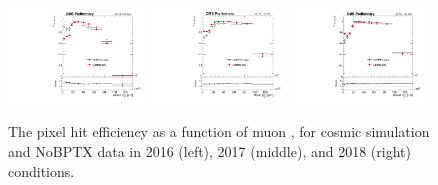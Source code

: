 \begin{figure}
\centering
\includegraphics[width=0.32\textwidth]{figures/systematics/muon_pixel_hit_eff/muonAbsD0_100000um_variableBins_coarse_2016.pdf}
\includegraphics[width=0.32\textwidth]{figures/systematics/muon_pixel_hit_eff/muonAbsD0_100000um_variableBins_coarse_2017.pdf}
\includegraphics[width=0.32\textwidth]{figures/systematics/muon_pixel_hit_eff/muonAbsD0_100000um_variableBins_coarse_2018.pdf}
\caption{The pixel hit efficiency as a function of muon \ad, for cosmic simulation and NoBPTX data in 2016 (left), 2017 (middle), and 2018 (right) conditions.}
\label{muon_pixel_hit_eff}
\end{figure}